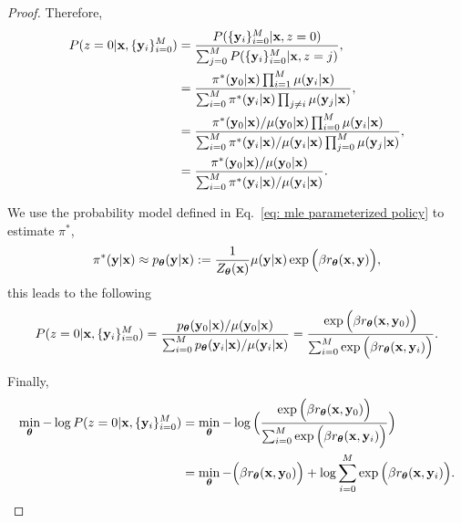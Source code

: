 \begin{proof}
Therefore,
\begin{align*}
P(z = 0 | \mathbf{x}, \{ \mathbf{y}_i \}_{i=0}^M)
& =\frac{P(\{ \mathbf{y}_i \}_{i=0}^M | \mathbf{x}, z = 0)}
{\sum_{j=0}^M P(\{ \mathbf{y}_i \}_{i=0}^M | \mathbf{x}, z = j)},
\\
& =
\frac{\pi^{\ast}(\mathbf{y}_0 | \mathbf{x}) \prod_{i=1}^M
\mu(\mathbf{y}_i | \mathbf{x})}
{\sum_{i=0}^M \pi^{\ast}(\mathbf{y}_i | \mathbf{x}) \prod_{j \neq i} \mu(\mathbf{y}_j | \mathbf{x})},
\\
& =
\frac{\pi^{\ast}(\mathbf{y}_0 | \mathbf{x}) / \mu(\mathbf{y}_0 | \mathbf{x}) \prod_{i=0}^M \mu(\mathbf{y}_i | \mathbf{x})}
{\sum_{i=0}^M \pi^{\ast}(\mathbf{y}_i | \mathbf{x}) / \mu(\mathbf{y}_i | \mathbf{x}) \prod_{j=0}^M \mu(\mathbf{y}_j | \mathbf{x})},
\\
& =
\frac{\pi^{\ast}(\mathbf{y}_0 | \mathbf{x}) / \mu(\mathbf{y}_0 | \mathbf{x})}
{\sum_{i=0}^M \pi^{\ast}(\mathbf{y}_i | \mathbf{x}) / \mu(\mathbf{y}_i | \mathbf{x})}.
\end{align*}

We use the probability model defined in Eq.~\eqref{eq: mle parameterized policy} to estimate $\pi^{\ast}$,
\begin{equation*}
\pi^{\ast}(\mathbf{y} | \mathbf{x})
\approx
p_{\boldsymbol\theta}(\mathbf{y} | \mathbf{x})
: =
\frac{1} {Z_{\boldsymbol\theta}(\mathbf{x})}
\mu(\mathbf{y} | \mathbf{x}) 
\exp\Big(
\beta
r_{\boldsymbol\theta}(\mathbf{x}, \mathbf{y})
\Big),
\end{equation*}
this leads to the following
\begin{equation*}
P(z = 0 | \mathbf{x}, \{ \mathbf{y}_i \}_{i=0}^M)
=
\frac{p_{\boldsymbol\theta}(\mathbf{y}_0 | \mathbf{x}) / \mu(\mathbf{y}_0 | \mathbf{x})}
{\sum_{i=0}^M p_{\boldsymbol\theta}(\mathbf{y}_i | \mathbf{x}) / \mu(\mathbf{y}_i | \mathbf{x})}
= 
\frac{\exp\Big(
\beta
r_{\boldsymbol\theta}(\mathbf{x}, \mathbf{y}_0)
\Big)}
{\sum_{i=0}^M \exp\Big(
\beta
r_{\boldsymbol\theta}(\mathbf{x}, \mathbf{y}_i)
\Big)}.
\end{equation*}

Finally,
\begin{align*}
\min \limits_{\boldsymbol\theta}
- \log P(z = 0 | \mathbf{x}, \{ \mathbf{y}_i \}_{i=0}^M)
& =
\min \limits_{\boldsymbol\theta}
- \log
\Big(
\frac{\exp\Big(
\beta
r_{\boldsymbol\theta}(\mathbf{x}, \mathbf{y}_0)
\Big)}
{\sum_{i=0}^M \exp\Big(
\beta
r_{\boldsymbol\theta}(\mathbf{x}, \mathbf{y}_i)
\Big)}
\Big)
\\
& =
\min \limits_{\boldsymbol\theta}
-
\Big(
\beta
r_{\boldsymbol\theta}(\mathbf{x}, \mathbf{y}_0)
\Big)
+
\log
{\sum_{i=0}^M \exp
\Big(
\beta
r_{\boldsymbol\theta}(\mathbf{x}, \mathbf{y}_i)
\Big)}.
\end{align*}
\end{proof}



